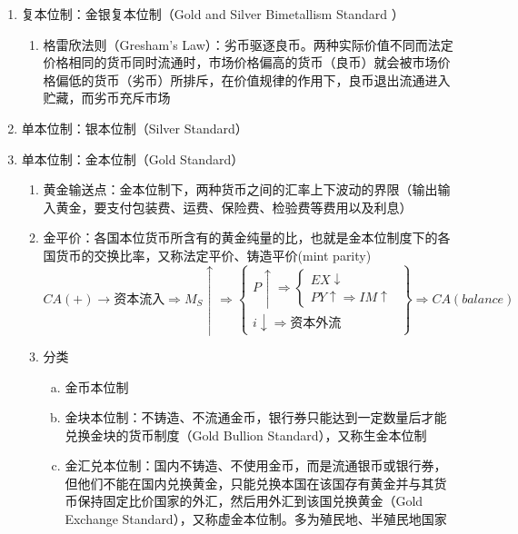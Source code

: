 \documentclass[12pt]{book}
\begin{document}
\begin{enumerate}[1.]
    \item 复本位制：金银复本位制（Gold and Silver Bimetallism Standard ）
          \begin{enumerate}[(1)]
              \item 格雷欣法则（Gresham's Law）：劣币驱逐良币。两种实际价值不同而法定价格相同的货币同时流通时，市场价格偏高的货币（良币）就会被市场价格偏低的货币（劣币）所排斥，在价值规律的作用下，良币退出流通进入贮藏，而劣币充斥市场
          \end{enumerate}
    \item 单本位制：银本位制（Silver Standard）
    \item 单本位制：金本位制（Gold Standard）
          \begin{enumerate}[(1)]
              \item 黄金输送点：金本位制下，两种货币之间的汇率上下波动的界限（输出输入黄金，要支付包装费、运费、保险费、检验费等费用以及利息）
              \item 金平价：各国本位货币所含有的黄金纯量的比，也就是金本位制度下的各国货币的交换比率，又称法定平价、铸造平价(mint parity)
                    \begin{equation*}
                        CA(+) \rightarrow \text{资本流入}\Rightarrow  M_{S}\uparrow \Rightarrow 
                        \begin{Bmatrix}
                            P\uparrow \Rightarrow 
                            \begin{cases}
                                EX\downarrow \\
                                PY\uparrow \Rightarrow IM↑
                            \end{cases} \\
                            i\downarrow \Rightarrow \text{资本外流}
                        \end{Bmatrix}
                        \Rightarrow CA(balance)
                    \end{equation*}
              \item 分类
                    \begin{enumerate}[a.]
                        \item 金币本位制
                        \item 金块本位制：不铸造、不流通金币，银行券只能达到一定数量后才能兑换金块的货币制度（Gold Bullion Standard），又称生金本位制
                        \item 金汇兑本位制：国内不铸造、不使用金币，而是流通银币或银行券，但他们不能在国内兑换黄金，只能兑换本国在该国存有黄金并与其货币保持固定比价国家的外汇，然后用外汇到该国兑换黄金（Gold Exchange Standard），又称虚金本位制。多为殖民地、半殖民地国家
                    \end{enumerate}
          \end{enumerate}
\end{enumerate}
\end{document}
